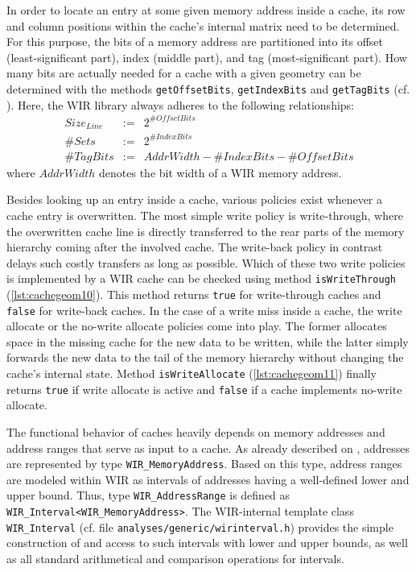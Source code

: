 In order to locate an entry at some given memory address inside a cache, its row and column positions within the cache's internal matrix need to be determined.
For this purpose, the bits of a memory address are partitioned into its offset (least-significant part), index (middle part), and tag (most-significant part).
How many bits are actually needed for a cache with a given geometry can be determined with the methods \texttt{getOffsetBits}, \texttt{getIndexBits} and \texttt{getTagBits} (cf. ).
Here, the \gls{WIR} library always adheres to the following relationships:
\begin{displaymath}
  \begin{array}{rcl}
    \mathit{Size}_\mathit{Line} & := & 2^\mathit{\#Offset Bits} \\
    \mathit{\#Sets} & := & 2^\mathit{\#Index Bits} \\
    \mathit{\#Tag Bits} & := & \mathit{AddrWidth} - \mathit{\#Index Bits} - \mathit{\#Offset Bits}
  \end{array}
\end{displaymath}
where $\mathit{AddrWidth}$ denotes the bit width of a \gls{WIR} memory address.

Besides looking up an entry inside a cache, various policies exist whenever a cache entry is overwritten.
The most simple write policy is write-through, where the overwritten cache line is directly transferred to the rear parts of the memory hierarchy coming after the involved cache.
The write-back policy in contrast delays such costly transfers as long as possible.
Which of these two write policies is implemented by a \gls{WIR} cache can be checked using method \texttt{isWriteThrough} (\cref{lst:cachegeom10}).
This method returns \texttt{true} for write-through caches and \texttt{false} for write-back caches.
In the case of a write miss inside a cache, the write allocate or the no-write allocate policies come into play.
The former allocates space in the missing cache for the new data to be written, while the latter simply forwards the new data to the tail of the memory hierarchy without changing the cache's internal state.
Method \texttt{isWriteAllocate} (\cref{lst:cachegeom11}) finally returns \texttt{true} if write allocate is active and \texttt{false} if a cache implements no-write allocate.

The functional behavior of caches heavily depends on memory addresses and address ranges that serve as input to a cache.
As already described on , addresses are represented by type \texttt{WIR\_MemoryAddress}.
Based on this type, address ranges are modeled within \gls{WIR} as intervals of addresses having a well-defined lower and upper bound.
Thus, type \texttt{WIR\_AddressRange} is defined as \texttt{WIR\_Interval<WIR\_MemoryAddress>}.
The \gls{WIR}-internal template class \texttt{WIR\_Interval} (cf. file \texttt{analyses/generic/wirinterval.h}) provides the simple construction of and access to such intervals with lower and upper bounds, as well as all standard arithmetical and comparison operations for intervals.


